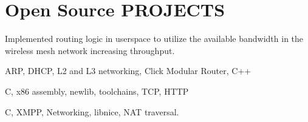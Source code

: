 \documentclass[]{deedy-resume-openfont}
\begin{document}
\begin{minipage}[t]{0.66\textwidth}
\section{Open Source PROJECTS}
\begin{tightemize}
\item Implemented routing logic in userspace to utilize the available bandwidth in the wireless mesh network increasing throughput.
\item ARP, DHCP, L2 and L3 networking, Click Modular Router, C++
\end{tightemize}
\sectionsep %
\begin{tightemize}
\item C, x86 assembly, newlib, toolchains, TCP, HTTP
\end{tightemize}
\sectionsep %
\begin{tightemize}
\item C, XMPP, Networking, libnice, NAT traversal.
\end{tightemize}
\end{minipage} 
\end{document}
